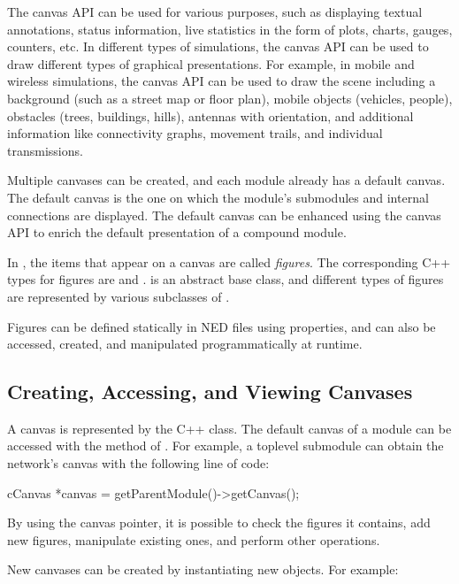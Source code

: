 The canvas API can be used for various purposes, such as displaying textual
annotations, status information, live statistics in the form of plots, charts,
gauges, counters, etc. In different types of simulations, the canvas API can be
used to draw different types of graphical presentations. For example, in mobile
and wireless simulations, the canvas API can be used to draw the scene including
a background (such as a street map or floor plan), mobile objects (vehicles,
people), obstacles (trees, buildings, hills), antennas with orientation, and
additional information like connectivity graphs, movement trails, and individual
transmissions.

Multiple canvases can be created, and each module already has a default canvas.
The default canvas is the one on which the module's submodules and internal
connections are displayed. The default canvas can be enhanced using the canvas
API to enrich the default presentation of a compound module.

In {\opp}, the items that appear on a canvas are called \textit{figures}. The
corresponding C++ types for figures are  and .
 is an abstract base class, and different types of figures are
represented by various subclasses of .

Figures can be defined statically in NED files using  properties,
and can also be accessed, created, and manipulated programmatically at runtime.


\subsection{Creating, Accessing, and Viewing Canvases}
\label{sec:graphics:creating-accessing-and-viewing-canvases}

A canvas is represented by the  C++ class. The default canvas of
a module can be accessed with the  method of
. For example, a toplevel submodule can obtain the network's
canvas with the following line of code:

\begin{cpp}
cCanvas *canvas = getParentModule()->getCanvas();
\end{cpp}

By using the canvas pointer, it is possible to check the figures it contains,
add new figures, manipulate existing ones, and perform other operations.

New canvases can be created by instantiating new  objects. For example:

